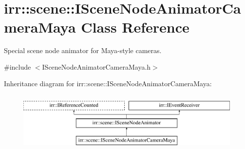 \hypertarget{classirr_1_1scene_1_1ISceneNodeAnimatorCameraMaya}{}\section{irr\+:\+:scene\+:\+:I\+Scene\+Node\+Animator\+Camera\+Maya Class Reference}
\label{classirr_1_1scene_1_1ISceneNodeAnimatorCameraMaya}


Special scene node animator for Maya-\/style cameras.  




{\ttfamily \#include $<$I\+Scene\+Node\+Animator\+Camera\+Maya.\+h$>$}

Inheritance diagram for irr\+:\+:scene\+:\+:I\+Scene\+Node\+Animator\+Camera\+Maya\+:\begin{figure}[H]
\begin{center}
\leavevmode
\includegraphics[height=3.000000cm]{classirr_1_1scene_1_1ISceneNodeAnimatorCameraMaya}
\end{center}
\end{figure}
